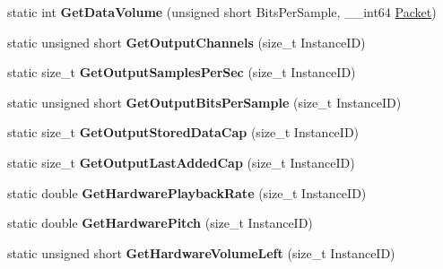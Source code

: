 \begin{DoxyCompactItemize}
\item 
\hypertarget{structmn_c_l_r_a92a5226e9f1bf24a649869be95b3ed11}{
static int {\bfseries GetDataVolume} (unsigned short BitsPerSample, \_\-\_\-int64 \hyperlink{class_packet}{Packet})}
\label{structmn_c_l_r_a92a5226e9f1bf24a649869be95b3ed11}

\item 
\hypertarget{structmn_c_l_r_a4aa0342e92874f26bdee23c6998c47bd}{
static unsigned short {\bfseries GetOutputChannels} (size\_\-t InstanceID)}
\label{structmn_c_l_r_a4aa0342e92874f26bdee23c6998c47bd}

\item 
\hypertarget{structmn_c_l_r_a3f0af86ae881f92b08d906b31c58c14f}{
static size\_\-t {\bfseries GetOutputSamplesPerSec} (size\_\-t InstanceID)}
\label{structmn_c_l_r_a3f0af86ae881f92b08d906b31c58c14f}

\item 
\hypertarget{structmn_c_l_r_a306160d84d4d6604195f577f5790a158}{
static unsigned short {\bfseries GetOutputBitsPerSample} (size\_\-t InstanceID)}
\label{structmn_c_l_r_a306160d84d4d6604195f577f5790a158}

\item 
\hypertarget{structmn_c_l_r_ae7e0a4f3ad5b3a2058aba051df4b858d}{
static size\_\-t {\bfseries GetOutputStoredDataCap} (size\_\-t InstanceID)}
\label{structmn_c_l_r_ae7e0a4f3ad5b3a2058aba051df4b858d}

\item 
\hypertarget{structmn_c_l_r_a46c7a5038aafe396c44fd7587d206bd7}{
static size\_\-t {\bfseries GetOutputLastAddedCap} (size\_\-t InstanceID)}
\label{structmn_c_l_r_a46c7a5038aafe396c44fd7587d206bd7}

\item 
\hypertarget{structmn_c_l_r_a3a803bc1f0dc4c51e5c8b887e8a6eaa7}{
static double {\bfseries GetHardwarePlaybackRate} (size\_\-t InstanceID)}
\label{structmn_c_l_r_a3a803bc1f0dc4c51e5c8b887e8a6eaa7}

\item 
\hypertarget{structmn_c_l_r_afe36364944ca4e74b18183d4534ce029}{
static double {\bfseries GetHardwarePitch} (size\_\-t InstanceID)}
\label{structmn_c_l_r_afe36364944ca4e74b18183d4534ce029}

\item 
\hypertarget{structmn_c_l_r_ac5d31e2e25c3cf1bd168441f7f5221ea}{
static unsigned short {\bfseries GetHardwareVolumeLeft} (size\_\-t InstanceID)}
\label{structmn_c_l_r_ac5d31e2e25c3cf1bd168441f7f5221ea}


\end{DoxyCompactItemize}
